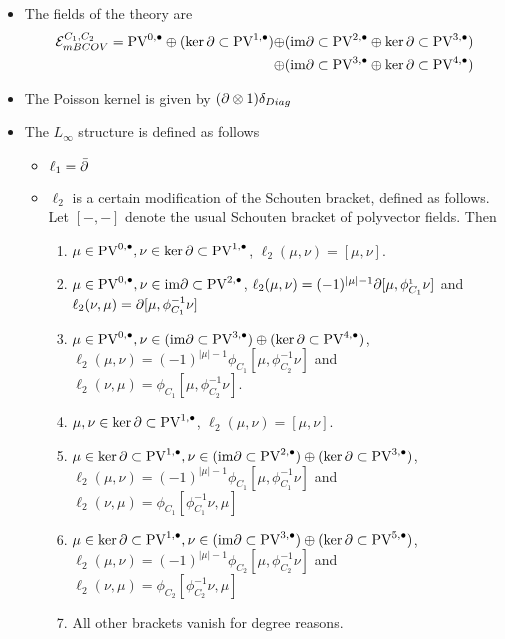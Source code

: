 \documentclass[11pt]{article}
\begin{document}
\begin{itemize}
\item The fields of the theory are
 \[\begin{aligned} \mathcal{E}_{mBCOV}^{C_1,C_2} = \text{PV}^{0,\bullet} \oplus (\ker\partial\subset\text{PV}^{1,\bullet})\oplus & (\text{im}\partial\subset\text{PV}^{2,\bullet} \oplus\ker\partial\subset\text{PV}^{3,\bullet})\\ \oplus &(\text{im}\partial\subset\text{PV}^{3,\bullet}\oplus\ker\partial\subset\text{PV}^{4,\bullet})\end{aligned}\]
\item The Poisson kernel is given by $(\partial\otimes 1)\delta_{Diag}$
\item The \(L_\infty\) structure is defined as follows
\begin{itemize}
\item \(\ell_1=\bar{\partial}\)
\item \(\ell_2\) is a certain modification of the Schouten bracket, defined as follows. Let \([-,-]\) denote the usual Schouten bracket of polyvector fields. Then

\begin{enumerate}
\item \(\mu\in\text{PV}^{0,\bullet}, \nu\in\ker\partial\subset\text{PV}^{1,\bullet}\), \(\ell_2(\mu,\nu)=[\mu,\nu]\).
\item \(\mu\in\text{PV}^{0,\bullet}, \nu\in\text{im}\partial\subset\text{PV}^{2,\bullet}\), \(\ell_2(\mu,\nu)=(-1)^{|\mu|-1}\partial[\mu,\phi^{_1}_{C_1}\nu]\) and \(\ell_2(\nu,\mu)=\partial[\mu,\phi^{-1}_{C_1}\nu]\)
\item \(\mu\in\text{PV}^{0,\bullet}, \nu\in(\text{im}\partial\subset\text{PV}^{3,\bullet})\oplus(\ker\partial\subset\text{PV}^{4,\bullet})\), \(\ell_2(\mu,\nu)=(-1)^{|\mu|-1}\phi_{C_1}[\mu, \phi^{-1}_{C_2}\nu]\) and \(\ell_2(\nu, \mu)=\phi_{C_1}[\mu, \phi^{-1}_{C_2}\nu]\).
\item \(\mu,\nu\in\ker\partial\subset\text{PV}^{1,\bullet}\), \(\ell_2(\mu,\nu)=[\mu,\nu]\).
\item \(\mu\in\ker\partial\subset\text{PV}^{1,\bullet}, \nu\in(\text{im}\partial\subset\text{PV}^{2,\bullet})\oplus(\ker\partial\subset\text{PV}^{3,\bullet})\), \(\ell_2(\mu,\nu)=(-1)^{|\mu|-1}\phi_{C_1}[\mu, \phi^{-1}_{C_1}\nu]\) and \(\ell_2(\nu, \mu)=\phi_{C_1}[\phi^{-1}_{C_1}\nu, \mu]\)
\item \(\mu\in\ker\partial\subset\text{PV}^{1,\bullet}, \nu\in(\text{im}\partial\subset\text{PV}^{3,\bullet})\oplus(\ker\partial\subset\text{PV}^{5,\bullet})\), \(\ell_2(\mu,\nu)=(-1)^{|\mu|-1}\phi_{C_2}[\mu, \phi^{-1}_{C_2}\nu]\) and \(\ell_2(\nu, \mu)=\phi_{C_2}[\phi^{-1}_{C_2}\nu, \mu]\)
\item All other brackets vanish for degree reasons.
\end{enumerate}
\end{itemize}
\end{itemize}
\end{document}
